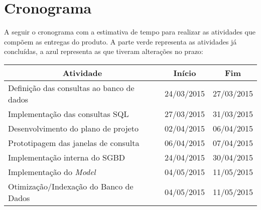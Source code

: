 \documentclass[a4paper,12pt]{article}
\begin{document}
\newpage
\section{Cronograma}

A seguir o cronograma com a estimativa de tempo para realizar as atividades que compõem as entregas do produto. A parte verde representa as atividades já concluídas, a azul representa as que tiveram alterações no prazo:\\

{\normalsize %

\begin{longtable}{|l|c|c|}
\hline
\multicolumn{1}{|c|}{\textbf{Atividade}}  & \multicolumn{1}{c|}{\textbf{Início}} & \multicolumn{1}{c|}{\textbf{Fim}} \\ \hline

\hline
\rowcolor{electricgreen}
Definição das consultas ao banco de dados & 24/03/2015                           & 27/03/2015                        \\ \hline

\hline
\rowcolor{electricgreen}
Implementação das consultas SQL           & 27/03/2015                           & 31/03/2015                        \\ \hline

\hline
\rowcolor{electricgreen}
Desenvolvimento do plano de projeto       & 02/04/2015                           & 06/04/2015                        \\ 

\hline
\rowcolor{electricgreen}
Prototipagem das janelas de consulta      & 06/04/2015                           & 07/04/2015                        \\ \hline

\hline
\rowcolor{electricgreen}
Implementação interna do SGBD             & 24/04/2015                           & 30/04/2015                        \\ \hline

\hline
\rowcolor{ultramarineblue}
Implementação do \textit{Model}           & 04/05/2015                           & 11/05/2015                        \\ \hline

\hline
\rowcolor{ultramarineblue}
Otimização/Indexação do Banco de Dados    & 04/05/2015                           & 11/05/2015                        \\ \hline


\end{longtable}}
\end{document}
